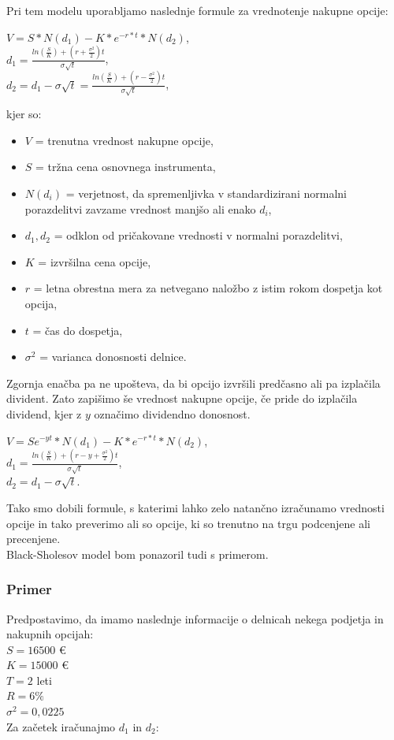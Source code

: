 \documentclass[12pt, a4paper]{amsart}
\theoremstyle{definition} %
\theoremstyle{plain} %
\begin{document}
Pri tem modelu uporabljamo naslednje formule za vrednotenje nakupne opcije:\\
\begin{center}
$V=S * N(d_1) - K * e^{-r*t} * N(d_2)$, 
\\[0,5 cm]
$d_1 = \tfrac{ln(\tfrac{S}{K}) + (r + \tfrac{\sigma^2}{2}) t}{\sigma \sqrt{t}}$, 
\\[0,5 cm]
$d_2 = d_1 - \sigma \sqrt{t} =  \tfrac{ln(\tfrac{S}{K}) + (r - \tfrac{\sigma^2}{2}) t}{\sigma \sqrt{t}}$,
\end{center}

kjer so:
\begin{itemize}
\item $V$ = trenutna vrednost nakupne opcije,
\item $S$ = tržna cena osnovnega instrumenta,
\item $N(d_i)$ = verjetnost, da spremenljivka v standardizirani normalni porazdelitvi zavzame vrednost manjšo ali enako $d_i$,
\item $d_1,d_2$ = odklon od pričakovane vrednosti v normalni porazdelitvi,
\item $K$ = izvršilna cena opcije,
\item $r$ = letna obrestna mera za netvegano naložbo z istim rokom dospetja kot opcija,
\item $t$ = čas do dospetja,
\item $\sigma^2$ = varianca donosnosti delnice.
\end{itemize}

Zgornja enačba pa ne upošteva, da bi opcijo izvršili predčasno ali pa izplačila divident. Zato zapišimo še vrednost nakupne opcije, če pride do izplačila dividend, kjer z $y$ označimo dividendno donosnost.
\begin{center}
$V=Se^{-yt}  * N(d_1) - K * e^{-r*t} * N(d_2)$, 
\\[0,5 cm]
$d_1 = \tfrac{ln(\tfrac{S}{K}) + (r - y + \tfrac{\sigma^2}{2}) t}{\sigma \sqrt{t}}$, 
\\[0,5 cm]
$d_2 = d_1 - \sigma \sqrt{t}$.
\end{center}

Tako smo dobili formule, s katerimi lahko zelo natančno izračunamo vrednosti opcije in tako preverimo ali so opcije, ki so trenutno na trgu podcenjene ali precenjene.\\
Black-Sholesov model bom ponazoril tudi s primerom.\\

\subsubsection{Primer}
Predpostavimo, da imamo naslednje informacije o delnicah nekega podjetja in nakupnih opcijah:\\
$S = 16500$ €\\
$K = 15000$ €\\
$T = 2$ leti\\
$R = 6 \%$\\
$\sigma^2 = 0,0225$ \\
Za začetek iračunajmo $d_1$ in $d_2$:\\
\end{document}
